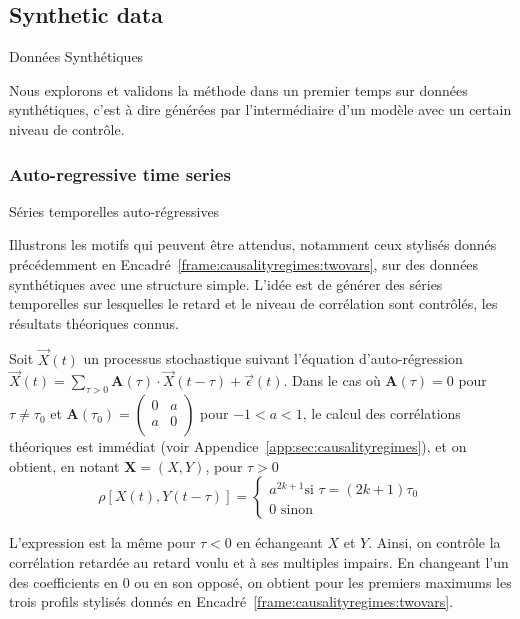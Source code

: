 


\subsection{Synthetic data}{Données Synthétiques}

Nous explorons et validons la méthode dans un premier temps sur données synthétiques, c'est à dire générées par l'intermédiaire d'un modèle avec un certain niveau de contrôle.


\subsubsection{Auto-regressive time series}{Séries temporelles auto-régressives}

Illustrons les motifs qui peuvent être attendus, notamment ceux stylisés donnés précédemment en Encadré~\ref{frame:causalityregimes:twovars}, sur des données synthétiques avec une structure simple. L'idée est de générer des séries temporelles sur lesquelles le retard et le niveau de corrélation sont contrôlés, les résultats théoriques connus.


Soit $\vec{X}(t)$ un processus stochastique suivant l'équation d'auto-régression $\vec{X}(t) = \sum_{\tau > 0} \mathbf{A}(\tau) \cdot \vec{X}(t - \tau ) + \vec{\epsilon}(t)$. Dans le cas où $\mathbf{A}(\tau) = 0$ pour $\tau \neq \tau_0$ et $\mathbf{A}(\tau_0) = \left( {\begin{array}{cc} 0 & a \\ a & 0 \\ \end{array}} \right)$ pour $-1<a<1$, le calcul des corrélations théoriques est immédiat (voir Appendice~\ref{app:sec:causalityregimes}), et on obtient, en notant $\mathbf{X} = (X,Y)$, pour $\tau > 0$
\[
\rho\left[X(t),Y(t-\tau)\right] = \begin{cases}
	a^{2k+1} \textrm{si } \tau = (2k+1)\tau_0\\
	0 \textrm{ sinon} 
\end{cases}
\]

L'expression est la même pour $\tau<0$ en échangeant $X$ et $Y$. Ainsi, on contrôle la corrélation retardée au retard voulu et à ses multiples impairs. En changeant l'un des coefficients en 0 ou en son opposé, on obtient pour les premiers maximums les trois profils stylisés donnés en Encadré~\ref{frame:causalityregimes:twovars}.

